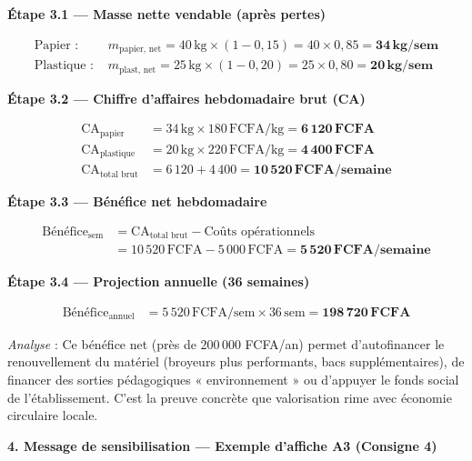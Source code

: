 \documentclass[11pt]{article}
\newcommand{\cle}[1]{{\popxbold\color{popdark}#1}}
\begin{document}
\begin{exoresolu}
\medskip
\noindent
\textbf{Étape 3.1 — Masse nette vendable (après pertes)}

\begin{align*}
\text{Papier : } & m_{\text{papier, net}} = 40\,\text{kg} \times (1 - 0,15) = 40 \times 0,85 = \mathbf{34\,kg/sem} \\[4pt]
\text{Plastique : } & m_{\text{plast, net}} = 25\,\text{kg} \times (1 - 0,20) = 25 \times 0,80 = \mathbf{20\,kg/sem}
\end{align*}

\medskip
\noindent
\textbf{Étape 3.2 — Chiffre d'affaires hebdomadaire brut (CA)}

\begin{align*}
\text{CA}_{\text{papier}} &= 34\,\text{kg} \times 180\,\text{FCFA/kg} = \mathbf{6\,120\,FCFA} \\
\text{CA}_{\text{plastique}} &= 20\,\text{kg} \times 220\,\text{FCFA/kg} = \mathbf{4\,400\,FCFA} \\
\text{CA}_{\text{total brut}} &= 6\,120 + 4\,400 = \mathbf{10\,520\,FCFA/semaine}
\end{align*}

\medskip
\noindent
\textbf{Étape 3.3 — Bénéfice net hebdomadaire}

\begin{align*}
\text{Bénéfice}_{\text{sem}} &= \text{CA}_{\text{total brut}} - \text{Coûts opérationnels} \\
&= 10\,520\,\text{FCFA} - 5\,000\,\text{FCFA} = \mathbf{5\,520\,FCFA/semaine}
\end{align*}

\medskip
\noindent
\textbf{Étape 3.4 — Projection annuelle (36 semaines)}

\begin{align*}
\text{Bénéfice}_{\text{annuel}} &= 5\,520\,\text{FCFA/sem} \times 36\,\text{sem} = \mathbf{198\,720\,FCFA}
\end{align*}

\medskip
\noindent
\emph{Analyse} : Ce bénéfice net (près de 200\,000 FCFA/an) permet d'autofinancer le renouvellement du matériel (broyeurs plus performants, bacs supplémentaires), de financer des sorties pédagogiques « environnement » ou d'appuyer le fonds social de l'établissement. C'est la preuve concrète que \cle{valorisation} rime avec \cle{économie circulaire} locale.

\vspace{0.5cm}
\noindent
\textbf{4. Message de sensibilisation — Exemple d'affiche A3 (Consigne 4)}


\end{exoresolu}
\end{document}
